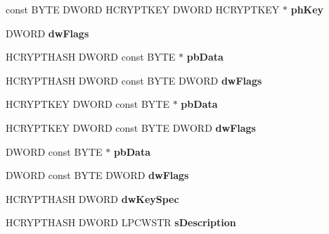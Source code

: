 \begin{DoxyCompactItemize}
const B\+Y\+TE D\+W\+O\+RD H\+C\+R\+Y\+P\+T\+K\+EY D\+W\+O\+RD H\+C\+R\+Y\+P\+T\+K\+EY $\ast$ {\bfseries ph\+Key}
\item 
\mbox{\label{structtag_p_r_o_v_f_u_n_c_s_ace63ee28b231690f2b346cbfe08de2ad}} 
D\+W\+O\+RD {\bfseries dw\+Flags}
\item 
\mbox{\label{structtag_p_r_o_v_f_u_n_c_s_abe2a9d723d5ec3c85fec951935eaf918}} 
H\+C\+R\+Y\+P\+T\+H\+A\+SH D\+W\+O\+RD const B\+Y\+TE $\ast$ {\bfseries pb\+Data}
\item 
\mbox{\label{structtag_p_r_o_v_f_u_n_c_s_aa525916a1c3627c294e919f5dfbe2c69}} 
H\+C\+R\+Y\+P\+T\+H\+A\+SH D\+W\+O\+RD const B\+Y\+TE D\+W\+O\+RD {\bfseries dw\+Flags}
\item 
\mbox{\label{structtag_p_r_o_v_f_u_n_c_s_af661971745ff8e2e415100ed12451c46}} 
H\+C\+R\+Y\+P\+T\+K\+EY D\+W\+O\+RD const B\+Y\+TE $\ast$ {\bfseries pb\+Data}
\item 
\mbox{\label{structtag_p_r_o_v_f_u_n_c_s_a4490f77484f7c63c1427e98c0474f357}} 
H\+C\+R\+Y\+P\+T\+K\+EY D\+W\+O\+RD const B\+Y\+TE D\+W\+O\+RD {\bfseries dw\+Flags}
\item 
\mbox{\label{structtag_p_r_o_v_f_u_n_c_s_a4f72acd1b4452252f01d025844b33312}} 
D\+W\+O\+RD const B\+Y\+TE $\ast$ {\bfseries pb\+Data}
\item 
\mbox{\label{structtag_p_r_o_v_f_u_n_c_s_abfafe1d48778a5402a69033c6aee7829}} 
D\+W\+O\+RD const B\+Y\+TE D\+W\+O\+RD {\bfseries dw\+Flags}
\item 
\mbox{\label{structtag_p_r_o_v_f_u_n_c_s_a88e5ed8aa26f65b9544bcf7859cef470}} 
H\+C\+R\+Y\+P\+T\+H\+A\+SH D\+W\+O\+RD {\bfseries dw\+Key\+Spec}
\item 
\mbox{\label{structtag_p_r_o_v_f_u_n_c_s_a1d34343c0ab01458fd82e42bae13df90}} 
H\+C\+R\+Y\+P\+T\+H\+A\+SH D\+W\+O\+RD L\+P\+C\+W\+S\+TR {\bfseries s\+Description}
\item 
\mbox{\label{structtag_p_r_o_v_f_u_n_c_s_a28a8aeb8d77b7a43be51235cee134abe}} 

\end{DoxyCompactItemize}
